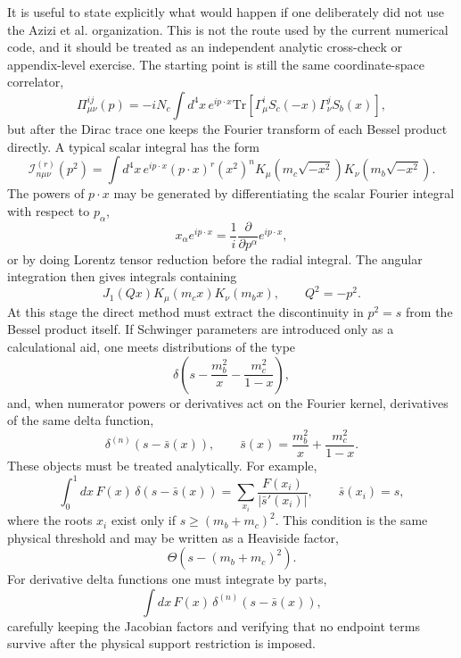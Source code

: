 \documentclass[11pt]{article}
\begin{document}
It is useful to state explicitly what would happen if one deliberately did
not use the Azizi et al. organization.  This is not the route used by the
current numerical code, and it should be treated as an independent analytic
cross-check or appendix-level exercise.  The starting point is still the same
coordinate-space correlator,
\begin{equation}
  \Pi_{\mu\nu}^{ij}(p)
  =
  -iN_c\int d^4x\,e^{ip\cdot x}
  \mathrm{Tr}\!\left[
    \Gamma_\mu^i S_c(-x)\Gamma_\nu^j S_b(x)
  \right],
\end{equation}
but after the Dirac trace one keeps the Fourier transform of each Bessel
product directly.  A typical scalar integral has the form
\begin{equation}
  \mathcal I_{n\mu\nu}^{(r)}(p^2)
  =
  \int d^4x\,e^{ip\cdot x}
  (p\cdot x)^r(x^2)^n
  K_\mu(m_c\sqrt{-x^2})K_\nu(m_b\sqrt{-x^2}) .
\end{equation}
The powers of \(p\cdot x\) may be generated by differentiating the scalar
Fourier integral with respect to \(p_\alpha\),
\begin{equation}
  x_\alpha e^{ip\cdot x}
  =
  \frac{1}{i}\frac{\partial}{\partial p^\alpha}e^{ip\cdot x},
\end{equation}
or by doing Lorentz tensor reduction before the radial integral.  The angular
integration then gives integrals containing
\begin{equation}
  J_1(Qx)K_\mu(m_cx)K_\nu(m_bx),
  \qquad Q^2=-p^2 .
\end{equation}
At this stage the direct method must extract the discontinuity in
\(p^2=s\) from the Bessel product itself.  If Schwinger parameters are
introduced only as a calculational aid, one meets distributions of the type
\begin{equation}
  \delta\!\left(s-\frac{m_b^2}{x}
                 -\frac{m_c^2}{1-x}\right),
\end{equation}
and, when numerator powers or derivatives act on the Fourier kernel,
derivatives of the same delta function,
\begin{equation}
  \delta^{(n)}\!\left(s-\bar s(x)\right),
  \qquad
  \bar s(x)=\frac{m_b^2}{x}+\frac{m_c^2}{1-x}.
\end{equation}
These objects must be treated analytically.  For example,
\begin{equation}
  \int_0^1 dx\,F(x)\,
  \delta\!\left(s-\bar s(x)\right)
  =
  \sum_{x_i}
  \frac{F(x_i)}
       {|\bar s'(x_i)|},
  \qquad
  \bar s(x_i)=s,
\end{equation}
where the roots \(x_i\) exist only if \(s\geq(m_b+m_c)^2\).  This condition
is the same physical threshold and may be written as a Heaviside factor,
\begin{equation}
  \Theta\!\left(s-(m_b+m_c)^2\right).
\end{equation}
For derivative delta functions one must integrate by parts,
\begin{equation}
  \int dx\,F(x)\,\delta^{(n)}(s-\bar s(x)),
\end{equation}
carefully keeping the Jacobian factors and verifying that no endpoint terms
survive after the physical support restriction is imposed.
\end{document}
